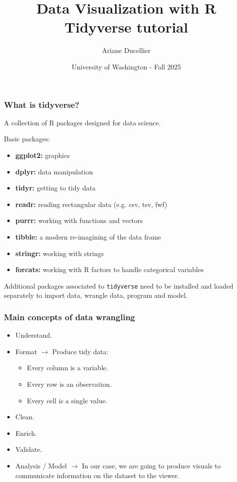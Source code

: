 \documentclass{beamer}
\title[Data Visualization with R - Tidyverse tutorial]{Data Visualization with R \\ Tidyverse tutorial}
\author{Ariane Ducellier}
\date{University of Washington - Fall 2025}
\begin{document}
	\begin{frame}
		\titlepage
	\end{frame}

	\begin{frame}[fragile]
		\frametitle{What is tidyverse?}

		A collection of R packages designed for data science.

		\vspace{1em}

		Basic packages:
		\begin{itemize}
			\item \textbf{ggplot2:} graphics
			\item \textbf{dplyr:} data manipulation
			\item \textbf{tidyr:} getting to tidy data
			\item \textbf{readr:} reading rectangular data (e.g. csv, tsv, fwf)
			\item \textbf{purrr:} working with functions and vectors
			\item \textbf{tibble:} a modern re-imagining of the data frame
			\item \textbf{stringr:} working with strings
			\item \textbf{forcats:} working with R factors to handle categorical variables
		\end{itemize}

		\vspace{1em}

		Additional packages associated to \verb|tidyverse| need to be installed and loaded separately to import data, wrangle data, program and model.		
		
	\end{frame}

	\begin{frame}
		\frametitle{Main concepts of data wrangling}

		\begin{itemize}
		\setlength{\itemsep}{1em}
			\item Understand.
			\item Format $\rightarrow$ Produce tidy data:
			\begin{itemize}
				\item Every column is a variable.
				\item Every row is an observation.
				\item Every cell is a single value.
			\end{itemize}
			\item Clean.
			\item Enrich.
			\item Validate.
			\item Analysis / Model $\rightarrow$ In our case, we are going to produce visuals to communicate information on the dataset to the viewer.
		\end{itemize}

	\end{frame}
\end{document}
